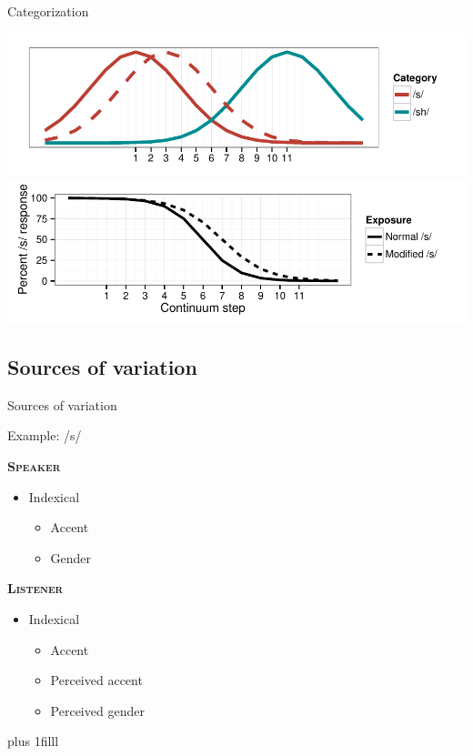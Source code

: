 \documentclass{beamer}
\newcommand{\btVFill}{\vskip0pt plus 1filll}
\begin{document}
\begin{frame}{Categorization}

\includegraphics[width=1.0\textwidth]{graphs/dist}
\vfill
\includegraphics[width=1.0\textwidth]{graphs/class}

\end{frame}

\subsection{Sources of variation}

\begin{frame}{Sources of variation}

Example: /s/

\begin{minipage}[t]{0.45\textwidth}

\textbf{\textsc{Speaker}}

\begin{itemize}
\item Indexical
\begin{itemize}
\item Accent
\item Gender
\end{itemize}

\end{itemize}
\end{minipage}
\hfill
\begin{minipage}[t]{0.45\textwidth}
\textbf{\textsc{Listener}}

\begin{itemize}
\item Indexical
\begin{itemize}
\item Accent
\item Perceived accent
\item Perceived gender
\end{itemize}
\end{itemize}
\end{minipage}
\btVFill
\begin{flushright}
\scriptsize
\citet{Strand1996, Li2011, Kraljic2005}
\end{flushright}
\end{frame}
\end{document}
